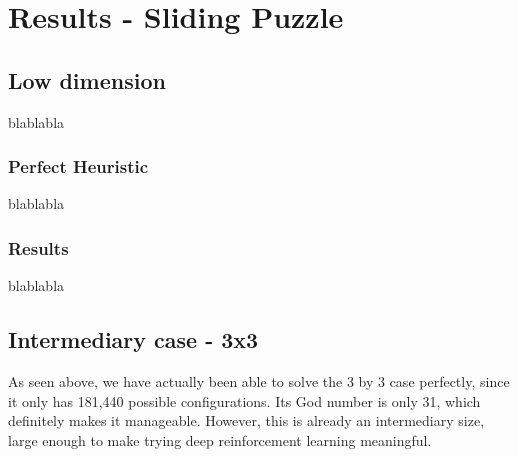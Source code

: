 
\chapter{Results - Sliding Puzzle} %

\label{Chapter4} %


\section{Low dimension}

blablabla

\subsection{Perfect Heuristic}

blablabla


\subsection{Results}

blablabla

\section{Intermediary case - 3x3}
\label{S33}
As seen above, we have actually been able to solve the 3 by 3 case perfectly, since it only has 181,440 possible configurations. Its God number is only 31, which definitely makes it manageable. However, this is already an intermediary size, large enough to make trying deep reinforcement learning meaningful.



